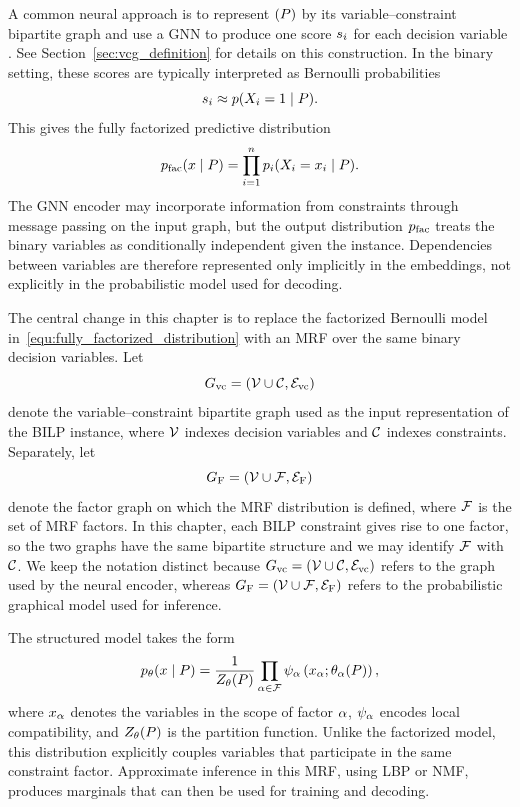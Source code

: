 A common neural approach is to represent $(P)$ by its variable--constraint bipartite graph and use a GNN to produce one score $s_i$ for each decision variable \cite{dai_learning_2017,gasse_exact_2019,nair_solving_2020,sun_difusco_2023}. See Section~\ref{sec:vcg_definition} for details on this construction. In the binary setting, these scores are typically interpreted as Bernoulli probabilities
\begin{equation*}
    s_i \approx p(X_i = 1 \mid P).
\end{equation*}
This gives the fully factorized predictive distribution
\begin{equation}
    \label{equ:fully_factorized_distribution}
    p_{\mathrm{fac}}(x \mid P)
    =
    \prod_{i=1}^{n}
    p_i(X_i = x_i \mid P).
\end{equation}
The GNN encoder may incorporate information from constraints through message passing on the input graph, but the output distribution $p_{\mathrm{fac}}$ treats the binary variables as conditionally independent given the instance. Dependencies between variables are therefore represented only implicitly in the embeddings, not explicitly in the probabilistic model used for decoding.

The central change in this chapter is to replace the factorized Bernoulli model in~\eqref{equ:fully_factorized_distribution} with an MRF over the same binary decision variables. Let
\begin{equation*}
    G_{\mathrm{vc}}=(\mathcal{V} \cup \mathcal{C}, \mathcal{E}_{\mathrm{vc}})
\end{equation*}
denote the variable--constraint bipartite graph used as the input representation of the BILP instance, where $\mathcal{V}$ indexes decision variables
and $\mathcal{C}$ indexes constraints. Separately, let 
\begin{equation*}
    G_{\mathrm{F}}=(\mathcal{V} \cup \mathcal{F},\mathcal{E}_{\mathrm{F}})
\end{equation*}
denote the factor graph on which the MRF distribution is defined, where $\mathcal{F}$ is the set of MRF factors. In this chapter, each BILP constraint gives rise to one factor, so the two graphs have the same bipartite structure and we may identify $\mathcal{F}$ with $\mathcal{C}$. We keep the notation distinct because $G_{\mathrm{vc}}=(\mathcal{V} \cup \mathcal{C}, \mathcal{E}_{\mathrm{vc}})$ refers to the graph used by the neural encoder, whereas $G_{\mathrm{F}}=(\mathcal{V} \cup \mathcal{F},\mathcal{E}_{\mathrm{F}})$ refers to the probabilistic graphical model used for inference.

The structured model takes the form
\begin{equation}
    \label{equ:mrf_distribution_intro}
    p_{\theta}(x \mid P)
    =
    \frac{1}{Z_{\theta}(P)}
    \prod_{\alpha \in \mathcal{F}}
    \psi_{\alpha}
    \left(x_{\alpha};\theta_{\alpha}(P)\right),
\end{equation}
where $x_{\alpha}$ denotes the variables in the scope of factor $\alpha$, $\psi_{\alpha}$ encodes local compatibility, and $Z_{\theta}(P)$ is the partition function. Unlike the factorized model, this distribution explicitly couples variables that participate in the same constraint factor. Approximate inference in this MRF, using LBP or NMF, produces marginals that can then be used for training and decoding.

